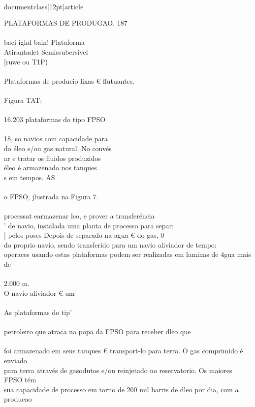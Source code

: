 \\documentclass[12pt]{article}
\begin{document}
PLATAFORMAS DE PRODUGAO, 187\\
\\
baci ighd bain! Plataforma\\
Atirantadet Semissubersivel\\
[ruwe ou T1P)\\
\\
Plataformas de producio fixas € flutuantes.\\
\\
Figura TAT:\\
\\
16.203 plataformas do tipo FPSO\\
\\
18, so navios com capacidade para\\
do éleo e/ou gas natural. No convés\\
ar e tratar os fluidos produzidos\\
éleo é armazenado nos tanques\\
s em tempos. AS\\
\\
o FPSO, jlustrada na Figura 7.\\
\\
processat earmazenar leo, e prover a transferéncia\\
' de navio, instalada uma planta de processo para separ:\\
| pelos poses Depois de separado na agua € do gas, 0\\
do proprio navio, sendo transferido para um navio aliviador de tempo:\\
operaces usando estas plataformas podem ser realizadas em laminas de 4gua mais de\\
\\
2.000 m.\\
O navio aliviador € um\\
\\
As plataformas do tip’\\
\\
petroleiro que atraca na popa da FPSO para receber dleo que\\
\\
foi armazenado em seus tanques € transport-lo para terra. O gas comprimido é enviado\\
para terra através de gasodutos e/ou reinjetado no reservatorio. Os maiores FPSO tém\\
sua capacidade de processo em torno de 200 mil barris de dleo por dia, com a producao\\
\\
\end{document}
